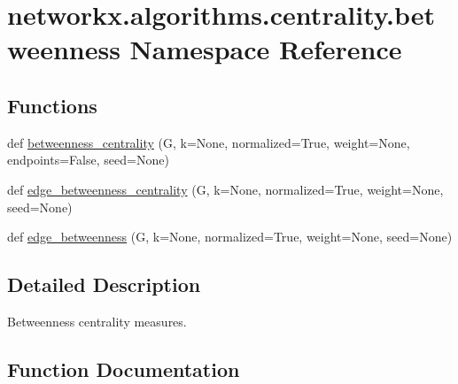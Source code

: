 \hypertarget{namespacenetworkx_1_1algorithms_1_1centrality_1_1betweenness}{}\section{networkx.\+algorithms.\+centrality.\+betweenness Namespace Reference}
\label{namespacenetworkx_1_1algorithms_1_1centrality_1_1betweenness}
\subsection*{Functions}
\begin{DoxyCompactItemize}
\item 
def \hyperlink{namespacenetworkx_1_1algorithms_1_1centrality_1_1betweenness_ae6df16e48bcdb82d0aaecfbf7b029927}{betweenness\+\_\+centrality} (G, k=None, normalized=True, weight=None, endpoints=False, seed=None)
\item 
def \hyperlink{namespacenetworkx_1_1algorithms_1_1centrality_1_1betweenness_aa216b09f42dfccc789fa205b0c17be29}{edge\+\_\+betweenness\+\_\+centrality} (G, k=None, normalized=True, weight=None, seed=None)
\item 
def \hyperlink{namespacenetworkx_1_1algorithms_1_1centrality_1_1betweenness_a222bc9e52fd1921c2544d84592337ab6}{edge\+\_\+betweenness} (G, k=None, normalized=True, weight=None, seed=None)
\end{DoxyCompactItemize}


\subsection{Detailed Description}
\begin{DoxyVerb}Betweenness centrality measures.\end{DoxyVerb}
 

\subsection{Function Documentation}
\mbox{\label{namespacenetworkx_1_1algorithms_1_1centrality_1_1betweenness_ae6df16e48bcdb82d0aaecfbf7b029927}} 
